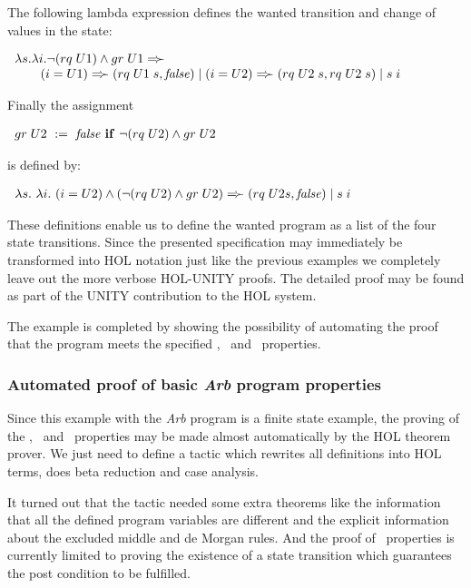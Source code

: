 The following lambda expression defines the wanted transition and change
of values in the state:

\cnn $ \begin{array}{l}
  \lambda s. \lambda i.
    \neg(rq\;U1) \wedge gr\;U1 =\!\succ\\
    \mbox{ \hspace{6mm}} (i = U1) =\!\succ (rq\;U1\;s, {\it false}) \mid
         (i = U2) =\!\succ (rq\;U2\;s, rq\;U2\;s) \mid s\;i
\end{array} $

\medskip
Finally the assignment

\cnn $ \begin{array}{l}
   gr\;U2\ :=\ {\it false}\ {\bf if}\ \neg(rq\;U2) \wedge gr\;U2
\end{array} $ 

is defined by:

\cnn $ \begin{array}{l}
  \lambda s.\ \lambda i.\
    (i = U2) \wedge (\neg(rq\;U2) \wedge gr\;U2) =\!\succ
        (rq\;U2 s, {\it false})
        \mid s\;i
\end{array} $

These definitions enable us to define the wanted program as a list of the
four state transitions.  Since the presented specification may immediately be
transformed into HOL notation just like the previous examples we completely
leave out the more verbose HOL-UNITY proofs.  The detailed proof may be found
as part of the UNITY contribution to the HOL system.

The example is completed by showing the possibility of automating the proof
that the program meets the specified \unless, \stable\ and \ensures\
properties.


\subsubsection{Automated proof of basic {\it Arb} program properties}

Since this example with the {\it Arb} program is a finite state example, the
proving of the \unless, \stable\ and \ensures\ properties may be made almost
automatically by the HOL theorem prover.  We just need to define a tactic which
rewrites all definitions into HOL terms, does beta reduction and case analysis.

It turned out that the tactic needed some extra theorems like the information
that all the defined program variables are different and the explicit
information about the excluded middle and de Morgan rules. And the proof of
\ensures\ properties is currently limited to proving the existence of a state
transition which guarantees the post condition to be fulfilled.

